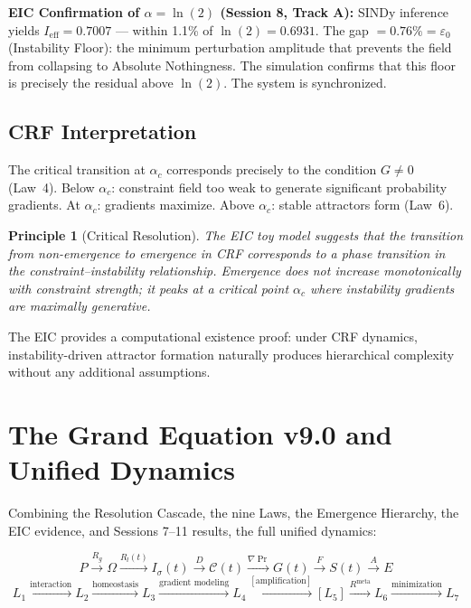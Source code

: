 \documentclass[12pt, a4paper]{article}
\newtheorem{principle}{Principle}[section]
\begin{document}
\textbf{EIC Confirmation of $\alpha = \ln(2)$ (Session 8, Track A):}
SINDy inference yields $I_{\mathrm{eff}} = 0.7007$ --- within 1.1\% of $\ln(2) = 0.6931$.
The gap $= 0.76\% = \varepsilon_0$ (Instability Floor): the minimum perturbation amplitude
that prevents the field from collapsing to Absolute Nothingness. The simulation confirms
that this floor is precisely the residual above $\ln(2)$. The system is synchronized.

\subsection{CRF Interpretation}

The critical transition at $\alpha_c$ corresponds precisely to the condition $G \neq 0$
(Law~4). Below $\alpha_c$: constraint field too weak to generate significant probability
gradients. At $\alpha_c$: gradients maximize. Above $\alpha_c$: stable attractors form
(Law~6).

\begin{principle}[Critical Resolution]
The EIC toy model suggests that the transition from non-emergence to emergence in CRF
corresponds to a phase transition in the constraint--instability relationship. Emergence
does not increase monotonically with constraint strength; it peaks at a critical point
$\alpha_c$ where instability gradients are maximally generative.
\end{principle}

The EIC provides a computational existence proof: under CRF dynamics, instability-driven
attractor formation naturally produces hierarchical complexity without any additional
assumptions.

\section{The Grand Equation v9.0 and Unified Dynamics}

Combining the Resolution Cascade, the nine Laws, the Emergence Hierarchy, the EIC
evidence, and Sessions 7--11 results, the full unified dynamics:

\[
  P \xrightarrow{R_g} \Omega
  \xrightarrow{R_l(t)} I_\sigma(t)
  \xrightarrow{D} \mathcal{C}(t)
  \xrightarrow{\nabla\Pr} G(t)
  \xrightarrow{F} S(t)
  \xrightarrow{A} E
\]
\[
  L_1 \xrightarrow{\text{interaction}} L_2
  \xrightarrow{\text{homeostasis}} L_3
  \xrightarrow{\text{gradient modeling}} L_4
  \xrightarrow{[\text{amplification}]} [L_5]
  \xrightarrow{R^{\mathrm{meta}}} L_6
  \xrightarrow{\text{minimization}} L_7
\]
\end{document}
